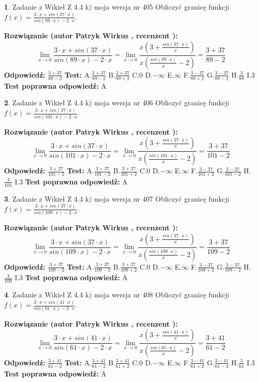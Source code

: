 \documentclass[12pt, a4paper]{article}
\theoremstyle{definition} %
\newtheorem{zad}{}
\newcommand{\zadStart}[1]{\begin{zad}#1\newline}
\newcommand{\zadStop}{\end{zad}}
\newcommand{\rozwStart}[2]{\noindent \textbf{Rozwiązanie (autor #1 , recenzent #2): }\newline}
\newcommand{\rozwStop}{\newline}
\newcommand{\odpStart}{\noindent \textbf{Odpowiedź:}\newline}
\newcommand{\odpStop}{\newline}
\newcommand{\testStart}{\noindent \textbf{Test:}\newline}
\newcommand{\testStop}{\newline}
\newcommand{\kluczStart}{\noindent \textbf{Test poprawna odpowiedź:}\newline}
\newcommand{\kluczStop}{\newline}
\begin{document}
\zadStart{Zadanie z Wikieł Z 4.4 k) moja wersja nr 405}
Obliczyć granicę funkcji $f(x)=\frac{3\cdot x +sin(37\cdot x)}{sin(89\cdot x) -2\cdot x}$.
\zadStop
\rozwStart{Patryk Wirkus}{}
$$\lim\limits_{x\to 0}\frac{3\cdot x +sin(37\cdot x)}{sin(89\cdot x) -2\cdot x}
=\lim\limits_{x\to 0}\frac{x(3+\frac{sin(37\cdot x)}{x})}{x(\frac{sin(89\cdot x)}{x}-2)}
=\frac{3+37}{89-2}$$
\rozwStop
\odpStart
$\frac{3+37}{89-2}$
\odpStop
\testStart
A.$\frac{3+37}{89-2}$
B.$\frac{3+37}{89+2}$
C.$0$
D.$-\infty$
E.$\infty$
F.$\frac{3-37}{89+2}$
G.$\frac{3-37}{89-2}$
H.$\frac{3}{89}$
I.$3$
\testStop
\kluczStart
A
\kluczStop



\zadStart{Zadanie z Wikieł Z 4.4 k) moja wersja nr 406}
Obliczyć granicę funkcji $f(x)=\frac{3\cdot x +sin(37\cdot x)}{sin(101\cdot x) -2\cdot x}$.
\zadStop
\rozwStart{Patryk Wirkus}{}
$$\lim\limits_{x\to 0}\frac{3\cdot x +sin(37\cdot x)}{sin(101\cdot x) -2\cdot x}
=\lim\limits_{x\to 0}\frac{x(3+\frac{sin(37\cdot x)}{x})}{x(\frac{sin(101\cdot x)}{x}-2)}
=\frac{3+37}{101-2}$$
\rozwStop
\odpStart
$\frac{3+37}{101-2}$
\odpStop
\testStart
A.$\frac{3+37}{101-2}$
B.$\frac{3+37}{101+2}$
C.$0$
D.$-\infty$
E.$\infty$
F.$\frac{3-37}{101+2}$
G.$\frac{3-37}{101-2}$
H.$\frac{3}{101}$
I.$3$
\testStop
\kluczStart
A
\kluczStop



\zadStart{Zadanie z Wikieł Z 4.4 k) moja wersja nr 407}
Obliczyć granicę funkcji $f(x)=\frac{3\cdot x +sin(37\cdot x)}{sin(109\cdot x) -2\cdot x}$.
\zadStop
\rozwStart{Patryk Wirkus}{}
$$\lim\limits_{x\to 0}\frac{3\cdot x +sin(37\cdot x)}{sin(109\cdot x) -2\cdot x}
=\lim\limits_{x\to 0}\frac{x(3+\frac{sin(37\cdot x)}{x})}{x(\frac{sin(109\cdot x)}{x}-2)}
=\frac{3+37}{109-2}$$
\rozwStop
\odpStart
$\frac{3+37}{109-2}$
\odpStop
\testStart
A.$\frac{3+37}{109-2}$
B.$\frac{3+37}{109+2}$
C.$0$
D.$-\infty$
E.$\infty$
F.$\frac{3-37}{109+2}$
G.$\frac{3-37}{109-2}$
H.$\frac{3}{109}$
I.$3$
\testStop
\kluczStart
A
\kluczStop



\zadStart{Zadanie z Wikieł Z 4.4 k) moja wersja nr 408}
Obliczyć granicę funkcji $f(x)=\frac{3\cdot x +sin(41\cdot x)}{sin(61\cdot x) -2\cdot x}$.
\zadStop
\rozwStart{Patryk Wirkus}{}
$$\lim\limits_{x\to 0}\frac{3\cdot x +sin(41\cdot x)}{sin(61\cdot x) -2\cdot x}
=\lim\limits_{x\to 0}\frac{x(3+\frac{sin(41\cdot x)}{x})}{x(\frac{sin(61\cdot x)}{x}-2)}
=\frac{3+41}{61-2}$$
\rozwStop
\odpStart
$\frac{3+41}{61-2}$
\odpStop
\testStart
A.$\frac{3+41}{61-2}$
B.$\frac{3+41}{61+2}$
C.$0$
D.$-\infty$
E.$\infty$
F.$\frac{3-41}{61+2}$
G.$\frac{3-41}{61-2}$
H.$\frac{3}{61}$
I.$3$
\testStop
\kluczStart
A
\kluczStop
\end{document}

